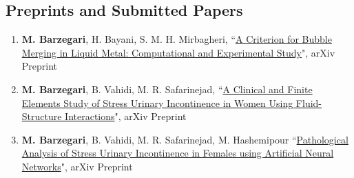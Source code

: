 \documentclass{cv}
\begin{document}
\subsection{Preprints and Submitted Papers}
\begin{enumerate}
\item
\textbf{M. Barzegari}, H. Bayani, S. M. H. Mirbagheri, ``\href{https://arxiv.org/abs/1708.01608}{A Criterion for Bubble Merging in Liquid Metal: Computational and Experimental Study}", arXiv Preprint
\item
\textbf{M. Barzegari}, B. Vahidi, M. R. Safarinejad, ``\href{https://arxiv.org/abs/1708.01601}{A Clinical and Finite Elements Study of Stress Urinary Incontinence in Women Using Fluid-Structure Interactions}", arXiv Preprint
\item
\textbf{M. Barzegari}, B. Vahidi, M. R. Safarinejad, M. Hashemipour ``\href{https://arxiv.org/abs/1803.01843}{Pathological Analysis of Stress Urinary Incontinence in Females using Artificial Neural Networks}", arXiv Preprint
\end{enumerate}
\end{document}

